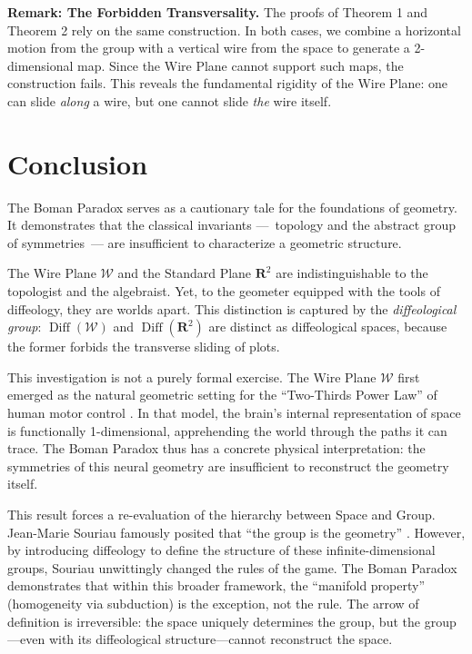 \documentclass[10pt,letterpaper,reqno]{amsart}
\newcommand{\RR}{\mathbf{R}}
\newcommand{\cW}{\mathcal{W}}
\DeclareMathOperator{\Diff}{Diff}
\begin{document}
  \textbf{Remark: The Forbidden Transversality.}
  The proofs of Theorem 1 and Theorem 2 rely on the same construction.
  In both cases,
  we combine a horizontal motion from the group with a vertical wire from the space to generate a 2-dimensional map.
  Since the Wire Plane cannot support such maps,
  the construction fails.
  This reveals the fundamental rigidity of the Wire Plane:
  one can slide \emph{along} a wire,
  but one cannot slide \emph{the} wire itself.
  
  
  \section{Conclusion}
  
  The Boman Paradox serves as a cautionary tale for the foundations of geometry.
  It demonstrates that the classical invariants
  ---~topology and the abstract group of symmetries~---
  are insufficient to characterize a geometric structure.
  
  The Wire Plane $\cW$ and the Standard Plane $\RR^2$ are indistinguishable to the topologist and the algebraist.
  Yet,
  to the geometer equipped with the tools of diffeology,
  they are worlds apart.
  This distinction is captured by the \emph{diffeological group}:
  $\Diff(\cW)$ and $\Diff(\RR^2)$ are distinct as diffeological spaces,
  because the former forbids the transverse sliding of plots.
  
  This investigation is not a purely formal exercise.
  The Wire Plane $\cW$ first emerged as the natural geometric setting for the ``Two-Thirds Power Law'' of human motor control \cite{PIZ25}.
  In that model,
  the brain's internal representation of space is functionally 1-dimensional,
  apprehending the world through the paths it can trace.
  The Boman Paradox thus has a concrete physical interpretation:
  the symmetries of this neural geometry are insufficient to reconstruct the geometry itself.
  
  This result forces a re-evaluation of the hierarchy between Space and Group.
  Jean-Marie Souriau famously posited that ``the group is the geometry'' \cite{Sou84}.
  However,
  by introducing diffeology to define the structure of these infinite-dimensional groups,
  Souriau unwittingly changed the rules of the game.
  The Boman Paradox demonstrates that within this broader framework,
  the ``manifold property'' (homogeneity via subduction) is the exception,
  not the rule.
  The arrow of definition is irreversible:
  the space uniquely determines the group,
  but the group---even with its diffeological structure---cannot reconstruct the space.
  
\end{document}
